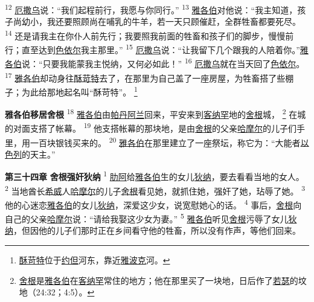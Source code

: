 \textsuperscript{12}
\uline{厄撒乌}说：“我们起程前行，我愿与你同行。”
\textsuperscript{13}
\uline{雅各伯}对他说：“我主知道，孩子尚幼小，我还要照顾尚在哺乳的牛羊，若一天只顾催赶，全群牲畜都要死尽。
\textsuperscript{14}
还是请我主在你仆人前先行；我要照我前面的牲畜和孩子们的脚步，慢慢前行；直至达到\uline{色依尔}我主那里。”
\textsuperscript{15}
\uline{厄撒乌}说：“让我留下几个跟我的人陪着你。”\uline{雅各伯}说：“只要我能蒙我主悦纳，又何必如此！”
\textsuperscript{16}
\uline{厄撒乌}就在当天回了\uline{色依尔}。
\textsuperscript{17}
\uline{雅各伯}却动身往\uline{酥苛特}去了，在那里为自己盖了一座房屋，为牲畜搭了些棚子；为此给那地起名叫“酥苛特”。
\footnote{\uline{酥苛特}位于\uline{约但}河东，靠近\uline{雅波克}河。}

\textbf{雅各伯移居舍根 }
\textsuperscript{18}
\uline{雅各伯}由\uline{帕丹}\uline{阿兰}回来，平安来到\uline{客纳罕}地的\uline{舍根}城，
\footnote{\uline{舍根}是\uline{雅各伯}在\uline{客纳罕}常住的地方；他在那里买了一块地，日后作了\uline{若瑟}的坟地（24:32；4:5）。}
在城的对面支搭了帐幕。
\textsuperscript{19}
他支搭帐幕的那块地，是由\uline{舍根}的父亲\uline{哈摩尔}的儿子们手里，用一百块银钱买来的。
\textsuperscript{20}
\uline{雅各伯}在那里建立了一座祭坛，称它为：“大能者\uline{以色列}的天主。”

\textbf{第三十四章 }
\textbf{舍根强奸狄纳 }
\textsuperscript{1}
\uline{肋阿}给\uline{雅各伯}生的女儿\uline{狄纳}，要去看看当地的女人。
\textsuperscript{2}
当地酋长\uline{希威}人\uline{哈摩尔}的儿子\uline{舍根}看见她，就抓住她，强奸了她，玷辱了她。
\textsuperscript{3}
他的心迷恋\uline{雅各伯}的女儿\uline{狄纳}，深爱这少女，说宽慰她心的话。
\textsuperscript{4}
事后，\uline{舍根}向自己的父亲\uline{哈摩尔}说：“请给我娶这少女为妻。”
\textsuperscript{5}
\uline{雅各伯}听见\uline{舍根}污辱了女儿\uline{狄纳}，但因他的儿子们那时正在乡间看守他的牲畜，所以没有作声，等他们回来。

